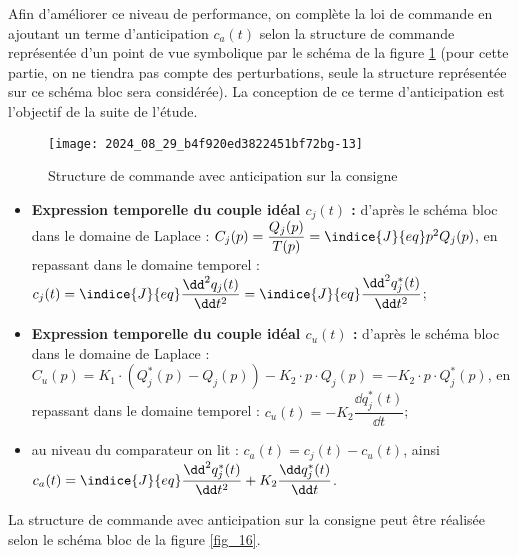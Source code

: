\ifprof
\else
Afin d'améliorer ce niveau de performance, on complète la loi de commande en ajoutant un terme d'anticipation $c_{a}(t)$ selon la structure de commande représentée d'un point de vue symbolique par le schéma de la figure \ref{fig_15} (pour cette partie, on ne tiendra pas compte des perturbations, seule la structure représentée sur ce schéma bloc sera considérée). La conception de ce terme d'anticipation est l'objectif de la suite de l'étude.

\begin{figure}[!h]
\centering
\texttt{[image: 2024\_08\_29\_b4f920ed3822451bf72bg-13]}
\caption{\label{fig_15} Structure de commande avec anticipation sur la consigne}
\end{figure}
\fi

\ifprof
\begin{corrige}
\begin{itemize}
\item \textbf{Expression temporelle du couple idéal $c_j(t)$ : }
d'après le schéma bloc dans le domaine de Laplace : $C_j(p)=\dfrac{Q_j(p)}{T(p)}=\indice{J}{eq}p^2Q_j(p)$, en repassant dans le domaine temporel : 
$
c_j(t)=\indice{J}{eq}\dfrac{\dd ^2q_j(t)}{\dd t^2}=\indice{J}{eq}\dfrac{\dd ^2q^*_j(t)}{\dd t^2}
$;
\item \textbf{Expression temporelle du couple idéal $c_u(t)$ : }
d'après le schéma bloc dans le domaine de Laplace : $C_u(p)=K_1\cdot (Q^*_j(p)-Q_j(p))-K_2\cdot p\cdot Q_j(p)=-K_2\cdot p\cdot Q^*_j(p)$, en repassant dans le domaine temporel : 
$
c_u(t)=-K_{2}\dfrac{\dd q^*_j(t)}{\dd t}$;
\item au niveau du comparateur on lit : $c_a(t)=c_j(t)-c_u(t)$, ainsi $c_a(t)=\indice{J}{eq}\dfrac{\dd ^2q^*_j(t)}{\dd t^2}+K_{2}\dfrac{\dd q^*_j(t)}{\dd t}$.
\end{itemize}
\end{corrige}
\else
\fi

\ifprof
\else
La structure de commande avec anticipation sur la consigne peut être réalisée selon le schéma bloc de la figure \ref{fig_16}.


